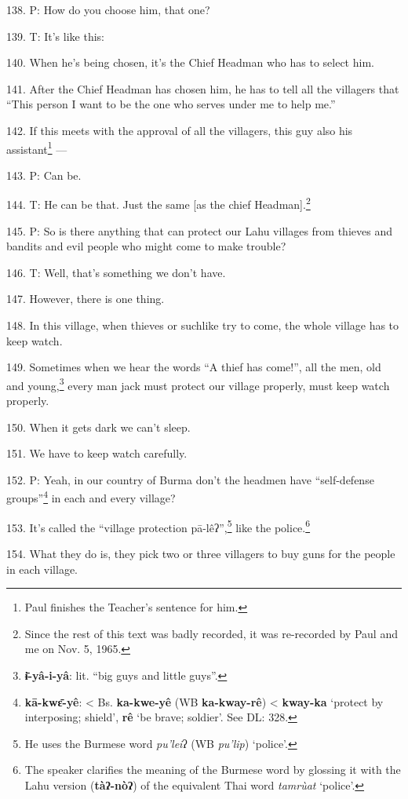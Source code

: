 138. P: How do you choose him, that one?

139. T: It's like this:

140. When he's being chosen, it's the Chief Headman who has to select him.

141. After the Chief Headman has chosen him, he has to tell all the villagers that
``This person I want to be the one who serves under me to help me.''

142. If this meets with the approval of all the villagers, this guy also his assistant\footnote{Paul finishes the Teacher's sentence for him.}
---

143. P: Can be.

144. T: He can be that. Just the same [as the chief Headman].\footnote{Since the rest of this text was badly recorded, it was re-recorded by Paul and me on Nov. 5, 1965.}

145. P: So is there anything that can protect our Lahu villages from thieves and
bandits and evil people who might come to make trouble?

146. T: Well, that's something we don't have.

147. However, there is one thing.

148. In this village, when thieves or suchlike try to come, the whole village has
to keep watch.

149. Sometimes when we hear the words ``A thief has come!'', all the men, old and
young,\footnote{\textbf{ɨ̄-yâ-i-yâ}: lit. ``big guys and little guys''.} every man jack must protect our village properly, must keep watch properly.

150. When it gets dark we can't sleep.

151. We have to keep watch carefully.

152. P: Yeah, in our country of Burma don't the headmen have ``self-defense groups''\footnote{\textbf{kā-kwɛ̄-yê}: < Bs. \textbf{ka-kwe-yê} (WB \textbf{ka-kway-rê}) < \textbf{kway-ka} `protect by interposing; shield', \textbf{rê} `be brave; soldier'. See DL: 328.}
in each and every village?

153. It's called the ``village protection pā-lêʔ'',\footnote{He uses the Burmese word \textit{pu'lei}ʔ (WB \textit{pu'lip}) `police'.} like the police.\footnote{The speaker clarifies the meaning of the Burmese word by glossing it with the Lahu version (\textbf{tàʔ-nòʔ}) of the equivalent Thai word \textit{tamrùat} `police'.}

154. What they do is, they pick two or three villagers to buy guns for the people
in each village.

